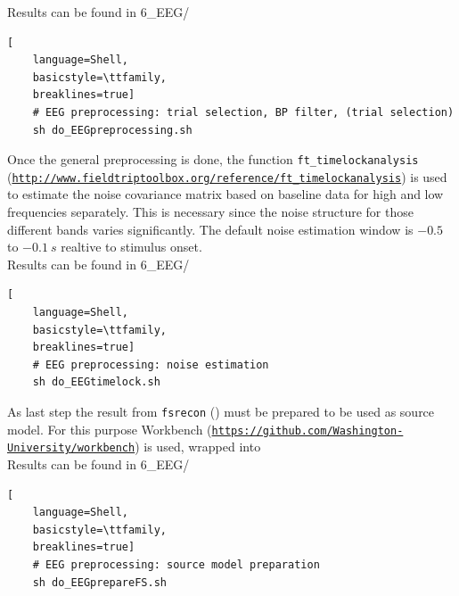\documentclass[12pt,a4paper]{scrartcl}
\begin{document}
\noindent Results can be found in 6\_EEG/\\
\begin{lstlisting}[
    language=Shell,
    basicstyle=\ttfamily,
    breaklines=true]
    # EEG preprocessing: trial selection, BP filter, (trial selection)
    sh do_EEGpreprocessing.sh
\end{lstlisting}
Once the general preprocessing is done, the function \texttt{ft\_timelockanalysis} (\href{http://www.fieldtriptoolbox.org/reference/ft\_timelockanalysis}{\nolinkurl{http://www.fieldtriptoolbox.org/reference/ft\_timelockanalysis}}) is used to estimate the noise covariance matrix based on baseline data for high and low frequencies separately. This is necessary since the noise structure for those different bands varies significantly. The default noise estimation window is $-0.5$ to $-0.1~s$ realtive to stimulus onset.\\

\noindent Results can be found in 6\_EEG/\\
\begin{lstlisting}[
    language=Shell,
    basicstyle=\ttfamily,
    breaklines=true]
    # EEG preprocessing: noise estimation
    sh do_EEGtimelock.sh
\end{lstlisting}
As last step the result from \texttt{fsrecon} (\texttt{}) must be prepared to be used as source model. For this purpose Workbench (\href{https://github.com/Washington-University/workbench}{\nolinkurl{https://github.com/Washington-University/workbench}}) is used, wrapped into \texttt{}\\

\noindent Results can be found in 6\_EEG/\\
\begin{lstlisting}[
    language=Shell,
    basicstyle=\ttfamily,
    breaklines=true]
    # EEG preprocessing: source model preparation
    sh do_EEGprepareFS.sh
\end{lstlisting}
\end{document}
